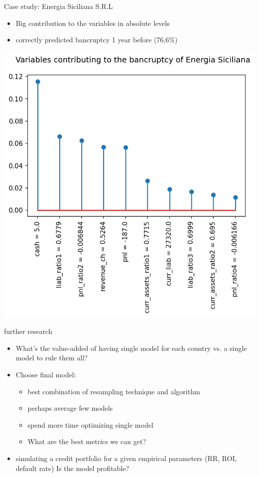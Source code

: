 \documentclass{beamer}
\begin{document}
\begin{frame}{Case study: Energia Siciliana S.R.L}

\begin{itemize}
\item Big contribution to the variables in absolute levels
\item correctly predicted bancruptcy 1 year before (76,6\%)
\end{itemize}


\begin{center}
\includegraphics[scale=0.4]{img/energia_plot.png}
\end{center}
\end{frame}

\begin{frame}{further research}
\begin{itemize}
\item What's the value-added of having single model for each country vs. a single model to rule them all?

\item Choose final model:

\begin{itemize}
\item best combination of resampling technique and algorithm
\item perhaps average few models
\item spend more time optimizing single model
\item What are the best metrics we can get?
\end{itemize}

\item simulating a credit portfolio for a given empirical parameters (RR, ROI, default rate) Is the model profitable?
\end{itemize}
\end{frame}
\end{document}
